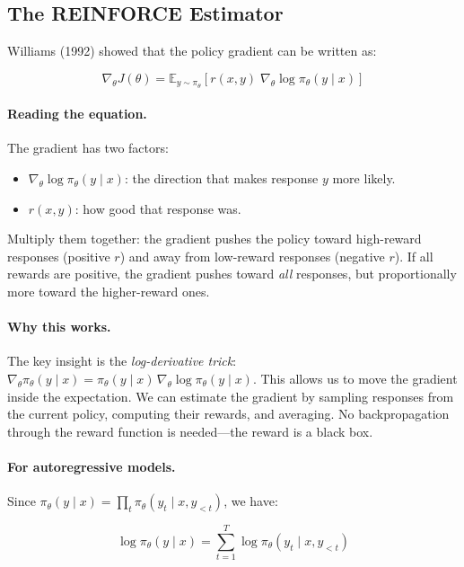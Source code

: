 \subsection{The REINFORCE Estimator}

Williams (1992) showed that the policy gradient can be written as:

\begin{equation}
\label{eq:reinforce}
\nabla_\theta J(\theta) = \mathbb{E}_{y \sim \pi_\theta}\!\left[r(x, y) \; \nabla_\theta \log \pi_\theta(y \mid x)\right]
\end{equation}

\paragraph{Reading the equation.} The gradient has two factors:
\begin{itemize}[nosep]
  \item $\nabla_\theta \log \pi_\theta(y \mid x)$: the direction that makes response $y$ more likely.
  \item $r(x, y)$: how good that response was.
\end{itemize}

Multiply them together: the gradient pushes the policy toward high-reward responses (positive $r$) and away from low-reward responses (negative $r$). If all rewards are positive, the gradient pushes toward \emph{all} responses, but proportionally more toward the higher-reward ones.

\paragraph{Why this works.} The key insight is the \emph{log-derivative trick}: $\nabla_\theta \pi_\theta(y \mid x) = \pi_\theta(y \mid x) \, \nabla_\theta \log \pi_\theta(y \mid x)$. This allows us to move the gradient inside the expectation. We can estimate the gradient by sampling responses from the current policy, computing their rewards, and averaging. No backpropagation through the reward function is needed---the reward is a black box.

\paragraph{For autoregressive models.} Since $\pi_\theta(y \mid x) = \prod_t \pi_\theta(y_t \mid x, y_{<t})$, we have:

\begin{equation}
\label{eq:log-prob-decomp}
\log \pi_\theta(y \mid x) = \sum_{t=1}^{T} \log \pi_\theta(y_t \mid x, y_{<t})
\end{equation}

